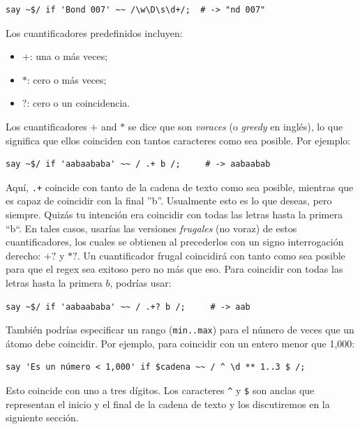 \begin{lstlisting}
say ~$/ if 'Bond 007' ~~ /\w\D\s\d+/;  # -> "nd 007"
\end{lstlisting}
%

Los cuantificadores predefinidos incluyen:
\begin{itemize}
\item $+$: una o más veces;
\item $*$: cero o más veces;
\item $?$: cero o un coincidencia.
\end{itemize}

Los cuantificadores $+$ and $*$ se dice que son \emph{voraces}
(o \emph{greedy} en inglés), lo que significa que ellos
coinciden con tantos caracteres como sea posible. Por ejemplo:

\begin{lstlisting}
say ~$/ if 'aabaababa' ~~ / .+ b /;     # -> aabaabab
\end{lstlisting}
%

Aquí, \verb|.+| coincide con tanto de la cadena de texto
como sea posible, mientras que es capaz de coincidir con
la final ''b''. Usualmente esto es lo que deseas, pero 
siempre. Quizás tu intención era coincidir con todas las letras
hasta la primera ``b``. En tales casos, usarías las versiones
\emph{frugales} (no voraz) de estos cuantificadores, los cuales
se obtienen al  precederlos con un signo interrogación derecho:
$+?$ y $*?$. Un cuantificador frugal coincidirá con tanto como
sea posible para que el regex sea exitoso pero no más que eso.
Para coincidir con todas las letras hasta la primera $b$, podrías
usar:

\begin{lstlisting}
say ~$/ if 'aabaababa' ~~ / .+? b /;     # -> aab
\end{lstlisting}
%

También podrías especificar un rango ({\tt min..max}) para el 
número de veces que un átomo debe coincidir. Por ejemplo, para 
coincidir con un entero menor que 1,000:

\begin{lstlisting}
say 'Es un número < 1,000' if $cadena ~~ / ^ \d ** 1..3 $ /;
\end{lstlisting}
%

Esto coincide con uno a tres dígitos. Los caracteres \verb|^|
y \verb|$| son anclas que representan el inicio y el final
de la cadena de texto y los discutiremos en la siguiente
sección.

